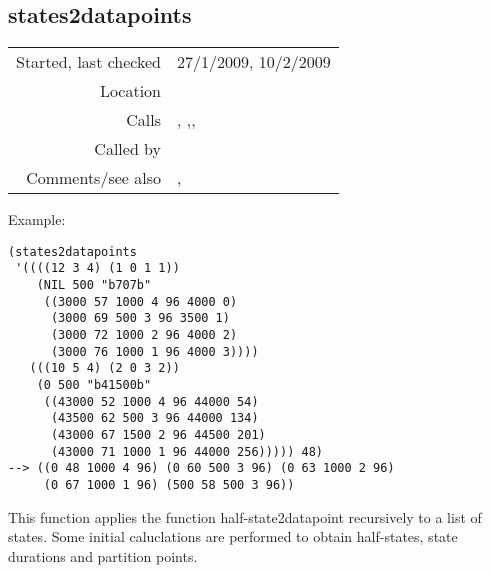 \subsection*{states2datapoints}\label{fun:states2datapoints}

\vspace{0.3cm}
\begin{tabular}{r|p{8cm}}
Started, last checked & 27/1/2009, 10/2/2009 \\
Location & \nameref{sec:markov-compose} \\
Calls & \nameref{fun:create-MIDI-note-numbers}, \nameref{fun:fibonacci-list},\newline \nameref{fun:half-state2datapoints}, \nameref{fun:state-durations} \\
Called by & \\
Comments/see also & \nameref{fun:states2datapoints-by-lookup},\newline \nameref{fun:states2datapoints-by-lookup<-}
\end{tabular}

\vspace{0.5cm}
\noindent Example:
\begin{verbatim}
(states2datapoints
 '((((12 3 4) (1 0 1 1))
    (NIL 500 "b707b"
     ((3000 57 1000 4 96 4000 0)
      (3000 69 500 3 96 3500 1)
      (3000 72 1000 2 96 4000 2)
      (3000 76 1000 1 96 4000 3))))
   (((10 5 4) (2 0 3 2))
    (0 500 "b41500b"
     ((43000 52 1000 4 96 44000 54)
      (43500 62 500 3 96 44000 134)
      (43000 67 1500 2 96 44500 201)
      (43000 71 1000 1 96 44000 256))))) 48)
--> ((0 48 1000 4 96) (0 60 500 3 96) (0 63 1000 2 96)
     (0 67 1000 1 96) (500 58 500 3 96))
\end{verbatim}

\noindent This function applies the function
half-state2datapoint recursively to a list of states.
Some initial caluclations are performed to obtain
half-states, state durations and partition points.





















